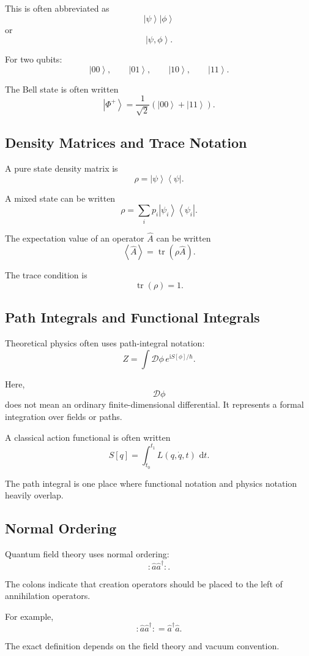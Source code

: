 \documentclass[11pt,twocolumn]{article}
\newcommand{\tr}{\operatorname{tr}}
\newcommand{\dd}{\,\mathrm{d}}
\newcommand{\ii}{\mathrm{i}}
\newcommand{\ket}[1]{\left|#1\right\rangle}
\newcommand{\ketbra}[2]{\left|#1\right\rangle\!\left\langle#2\right|}
\newcommand{\qop}[1]{\hat{#1}}
\newcommand{\expect}[1]{\left\langle #1 \right\rangle}
\newcommand{\normalorder}[1]{:\!#1\!:}
\begin{document}
This is often abbreviated as
\[
\ket{\psi}\ket{\phi}
\]
or
\[
\ket{\psi,\phi}.
\]

For two qubits:
\[
\ket{00},
\qquad
\ket{01},
\qquad
\ket{10},
\qquad
\ket{11}.
\]

The Bell state is often written
\[
\ket{\Phi^+}
=
\frac{1}{\sqrt{2}}
\left(
\ket{00}
+
\ket{11}
\right).
\]

\subsection{Density Matrices and Trace Notation}

A pure state density matrix is
\[
\rho
=
\ketbra{\psi}{\psi}.
\]

A mixed state can be written
\[
\rho
=
\sum_i p_i \ketbra{\psi_i}{\psi_i}.
\]

The expectation value of an operator \(\qop{A}\) can be written
\[
\expect{\qop{A}}
=
\tr(\rho\qop{A}).
\]

The trace condition is
\[
\tr(\rho)=1.
\]

\subsection{Path Integrals and Functional Integrals}

Theoretical physics often uses path-integral notation:
\[
Z
=
\int \mathcal{D}\phi\,
e^{\ii S[\phi]/\hbar}.
\]

Here,
\[
\mathcal{D}\phi
\]
does not mean an ordinary finite-dimensional differential. It represents a
formal integration over fields or paths.

A classical action functional is often written
\[
S[q]
=
\int_{t_0}^{t_1}
L(q,\dot{q},t)\,\dd t.
\]

The path integral is one place where functional notation and physics notation
heavily overlap.

\subsection{Normal Ordering}

Quantum field theory uses normal ordering:
\[
\normalorder{\qop{a}\qop{a}^{\dagger}}.
\]

The colons indicate that creation operators should be placed to the left of
annihilation operators.

For example,
\[
\normalorder{\qop{a}\qop{a}^{\dagger}}
=
\qop{a}^{\dagger}\qop{a}.
\]

The exact definition depends on the field theory and vacuum convention.
\end{document}
